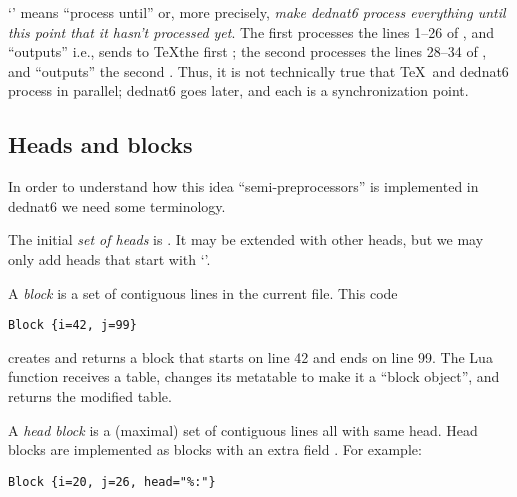 \documentclass{ltugboat}
\begin{document}
`\co{\\pu}' means ``process until'' \Dash or, more precisely, {\sl make
  dednat6 process everything until this point that it hasn't processed
  yet}. The first \co{\\pu} processes the lines 1--26 of , and
``outputs'' \Dash i.e., sends to \TeX \Dash the first
; the second \co{\\pu} processes the lines
28--34 of , and ``outputs'' the second
. Thus, it is not technically true that \TeX\ and dednat6
process  in parallel; dednat6 goes later, and each \co{\\pu} is
a synchronization point.



%                                                                               
\subsection{Heads and blocks}

In order to understand how this idea \Dash ``semi-pre\-pro\-cessors''
\Dash is implemented in dednat6 we need some terminology.

The initial {\sl set of heads} is . It may
be extended with other heads, but we may only add heads that
start with `\co{\%}'.

A {\sl block} is a set of contiguous lines in the current  file.
This code
%
\begin{verbatim}
Block {i=42, j=99}
\end{verbatim}
%
creates and returns a block that starts on line 42 and ends on line
99. The Lua function  receives a table, changes its
metatable to make it a ``block object'', and returns the modified
table.

A {\sl head block} is a (maximal) set of contiguous lines all with
same head. Head blocks are implemented as blocks with an extra field
. For example:
%
\begin{verbatim}
Block {i=20, j=26, head="%:"}
\end{verbatim}
\end{document}
